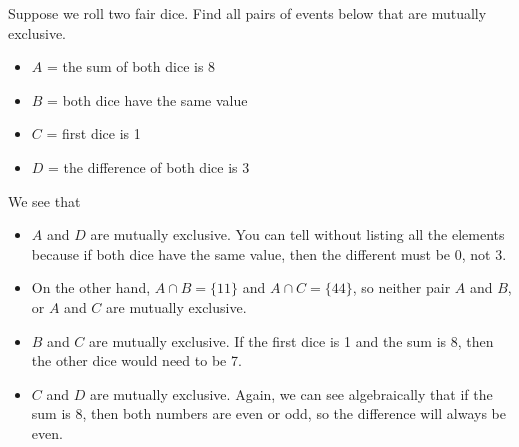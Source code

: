  
\begin{frame}[t] 
\begin{ex} 
Suppose we roll two fair dice. Find all pairs of events below that are mutually exclusive.
\begin{itemize}
\item $A$ = the sum of both dice is 8
\item $B$ = both dice have the same value
\item $C$ = first dice is 1
\item $D$ = the difference of both dice is 3
\end{itemize}
\end{ex} 
\end{frame}

\begin{frame}
\begin{sol}
We see that
\begin{itemize}
\item $A$ and $D$ are mutually exclusive. You can tell without listing all the elements because if both dice have the same value, then the different must be 0, not 3. 
\item On the other hand, $A \cap B = \{11\}$ and $A \cap C = \{44\}$, so neither pair $A$ and $B$, or $A$ and $C$ are mutually exclusive.
\item $B$ and $C$ are mutually exclusive. If the first dice is 1 and the sum is 8, then the other dice would need to be 7.
\item $C$ and $D$ are mutually exclusive. Again, we can see algebraically that if the sum is 8, then both numbers are even or odd, so the difference will always be even.
\end{itemize}

\end{sol}
\end{frame}

